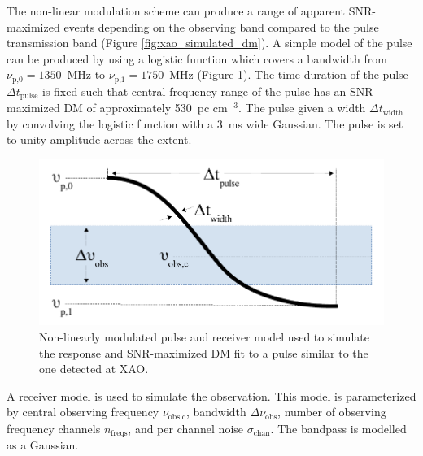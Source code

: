 \documentclass[a4paper,fleqn,usenatbib]{mnras}
\begin{document}
The non-linear modulation scheme can produce a range of apparent SNR-maximized
events depending on the observing band compared to the pulse transmission band
(Figure \ref{fig:xao_simulated_dm}).  A simple model of the pulse can be
produced by using a logistic function which covers a bandwidth from
$\nu_{\textrm{p,0}} = 1350$~MHz to $\nu_{\textrm{p,1}} = 1750$~MHz (Figure
\ref{fig:xao_simulation_diagram}). The time duration of the pulse $\Delta
t_{\textrm{pulse}}$ is fixed such that central frequency range of the pulse has
an SNR-maximized DM of approximately 530~pc cm$^{-3}$. The pulse given a width
$\Delta t_{\textrm{width}}$ by convolving the logistic function with a 3~ms wide
Gaussian. The pulse is set to unity amplitude across the extent.

\begin{figure}
    \includegraphics[width=1.0\linewidth]{figures/simulation_diagram.pdf}
    \caption{Non-linearly modulated pulse and receiver model used to simulate
    the response and SNR-maximized DM fit to a pulse similar to the one detected
    at XAO.
    }
    \label{fig:xao_simulation_diagram}
\end{figure}

A receiver model is used to simulate the observation. This model is
parameterized by central observing frequency $\nu_{\textrm{obs,c}}$, bandwidth
$\Delta \nu_{\textrm{obs}}$, number of observing frequency channels
$n_{\textrm{freqs}}$, and per channel noise $\sigma_{\textrm{chan}}$. The
bandpass is modelled as a Gaussian.
\end{document}
